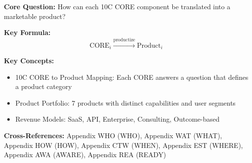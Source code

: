 
\begin{abstract}
This appendix translates the 10C CORE framework into seven distinct product opportunities. Each CORE component (WHO, WHAT, HOW, WHEN, WHERE, AWARE, READY) maps to a specific product category with defined capabilities, use cases, and revenue models. The mapping provides a strategic blueprint for commercializing EBF, demonstrating how theoretical constructs become practical tools for stakeholder analysis, wellbeing assessment, complementarity optimization, context detection, calibration, awareness measurement, and intervention design.
\end{abstract}


\begin{tcolorbox}[colback=blue!5!white, colframe=blue!75!black,
    title=Quick Reference: Product Options Matrix]

\textbf{Core Question:} How can each 10C CORE component be translated into a marketable product?

\textbf{Key Formula:}
\begin{equation}
\text{CORE}_i \xrightarrow{\text{productize}} \text{Product}_i
\end{equation}

\textbf{Key Concepts:}
\begin{itemize}[nosep]
\item 10C CORE to Product Mapping: Each CORE answers a question that defines a product category
\item Product Portfolio: 7 products with distinct capabilities and user segments
\item Revenue Models: SaaS, API, Enterprise, Consulting, Outcome-based
\end{itemize}

\textbf{Cross-References:} Appendix WHO (WHO), Appendix WAT (WHAT), Appendix HOW (HOW), Appendix CTW (WHEN), Appendix EST (WHERE), Appendix AWA (AWARE), Appendix REA (READY)
\end{tcolorbox}


